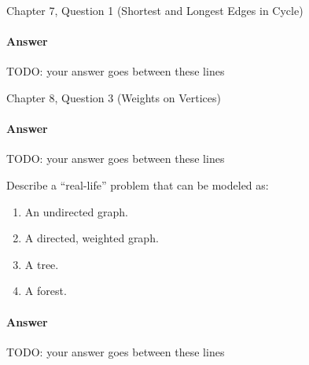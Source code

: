 \documentclass{article}
\begin{document}
\begin{enumerate}
		
\end{enumerate}


\nextprob
{}

Chapter 7, Question 1 (Shortest and Longest Edges in Cycle)

\paragraph{Answer}


TODO: your answer goes between these lines



\nextprob
{}

Chapter 8, Question 3 (Weights on Vertices)

\paragraph{Answer}


TODO: your answer goes between these lines





\nextprob
{}

Describe a ``real-life'' problem that can be modeled as:

\begin{enumerate}
    \item An undirected graph.
    \item A directed, weighted graph.
    \item A tree.
    \item A forest.
\end{enumerate}

\paragraph{Answer}


TODO: your answer goes between these lines
\end{document}
